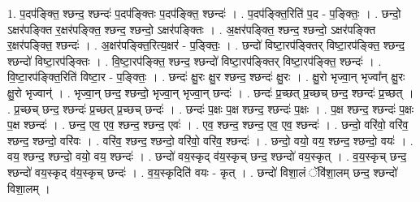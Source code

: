\documentclass[17pt]{extarticle}
\begin{document}
1. प॒दप॑ङ्क्ति॒ श्छन्द॒ श्छन्दः॑ प॒दप॑ङ्क्तिः प॒दप॑ङ्क्ति॒ श्छन्दः॑ । . प॒दप॑ङ्क्ति॒रिति॑ प॒द - प॒ङ्क्तिः॒ । . छन्दो॒ ऽक्षर॑पङ्क्ति र॒क्षर॑पङ्क्ति॒ श्छन्द॒ श्छन्दो॒ ऽक्षर॑पङ्क्तिः । . अ॒क्षर॑पङ्क्ति॒ श्छन्द॒ श्छन्दो॒ ऽक्षर॑पङ्क्ति र॒क्षर॑पङ्क्ति॒ श्छन्दः॑ । . अ॒क्षर॑पङ्क्ति॒रित्य॒क्षर॑ - प॒ङ्क्तिः॒ । . छन्दो॑ विष्टा॒रप॑ङ्क्तिर् विष्टा॒रप॑ङ्क्ति॒ श्छन्द॒ श्छन्दो॑ विष्टा॒रप॑ङ्क्तिः । . वि॒ष्टा॒रप॑ङ्क्ति॒ श्छन्द॒ श्छन्दो॑ विष्टा॒रप॑ङ्क्तिर् विष्टा॒रप॑ङ्क्ति॒ श्छन्दः॑ । . वि॒ष्टा॒रप॑ङ्क्ति॒रिति॑ विष्टा॒र - प॒ङ्क्तिः॒ । . छन्दः॑ क्षु॒रः क्षु॒र श्छन्द॒ श्छन्दः॑ क्षु॒रः । . क्षु॒रो भृज्वा॒न् भृज्वा᳚न् क्षु॒रः क्षु॒रो भृज्वान्॑ । . भृज्वा॒न् छन्द॒ श्छन्दो॒ भृज्वा॒न् भृज्वा॒न् छन्दः॑ । . छन्दः॑ प्र॒च्छत् प्र॒च्छच् छन्द॒ श्छन्दः॑ प्र॒च्छत् । . प्र॒च्छच् छन्द॒ श्छन्दः॑ प्र॒च्छत् प्र॒च्छच् छन्दः॑ । . छन्दः॑ प॒क्षः प॒क्ष श्छन्द॒ श्छन्दः॑ प॒क्षः । . प॒क्ष श्छन्द॒ श्छन्दः॑ प॒क्षः प॒क्ष श्छन्दः॑ । . छन्द॒ एव॒ एव॒ श्छन्द॒ श्छन्द॒ एवः॑ । . एव॒ श्छन्द॒ श्छन्द॒ एव॒ एव॒ श्छन्दः॑ । . छन्दो॒ वरि॑वो॒ वरि॑व॒ श्छन्द॒ श्छन्दो॒ वरि॑वः । . वरि॑व॒ श्छन्द॒ श्छन्दो॒ वरि॑वो॒ वरि॑व॒ श्छन्दः॑ । . छन्दो॒ वयो॒ वय॒ श्छन्द॒ श्छन्दो॒ वयः॑ । . वय॒ श्छन्द॒ श्छन्दो॒ वयो॒ वय॒ श्छन्दः॑ । . छन्दो॑ वय॒स्कृद् व॑य॒स्कृच् छन्द॒ श्छन्दो॑ वय॒स्कृत् । . व॒य॒स्कृच् छन्द॒ श्छन्दो॑ वय॒स्कृद् व॑य॒स्कृच् छन्दः॑ । . व॒य॒स्कृदिति॑ वयः - कृत् । . छन्दो॑ विशा॒लं ॅवि॑शा॒लम् छन्द॒ श्छन्दो॑ विशा॒लम् । \newline
\end{document}
